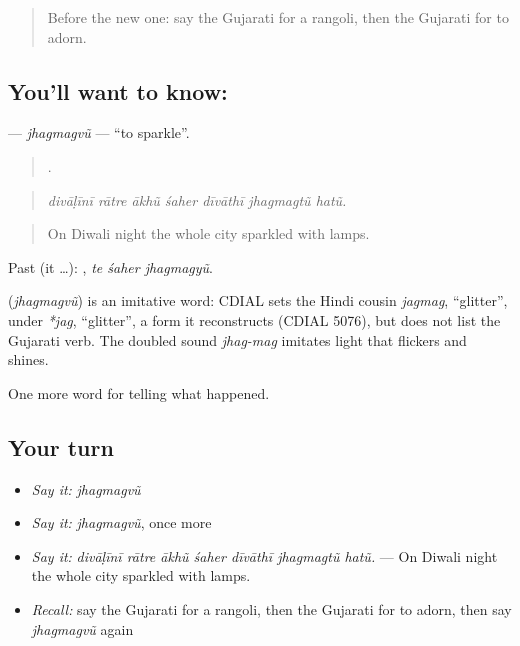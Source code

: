 \label{lesson:GU-C329-jhagmagvu}



\begin{quote}
Before the new one: say the Gujarati for a rangoli, then the Gujarati for to adorn.
\end{quote}

\subsection*{You'll want to know: }
\textbf{} — \emph{jhagmagvũ} — \textquotedblleft{}to sparkle\textquotedblright{}.

\begin{quote}
      .
\end{quote}

\begin{quote}
\emph{divāḷīnī rātre ākhũ śaher dīvāthī jhagmagtũ hatũ.}
\end{quote}

\begin{quote}
On Diwali night the whole city sparkled with lamps.
\end{quote}

Past (it …):   , \emph{te śaher jhagmagyũ}.

\begin{cousinweb}
\textbf{} (\emph{jhagmagvũ}) is an imitative word: CDIAL sets the Hindi cousin \emph{jagmag}, \textquotedblleft{}glitter\textquotedblright{}, under \emph{*jag}, \textquotedblleft{}glitter\textquotedblright{}, a form it reconstructs (CDIAL 5076), but does not list the Gujarati verb. The doubled sound \emph{jhag-mag} imitates light that flickers and shines.
\end{cousinweb}

\begin{grammarlens}[title={What you've built}]
One more word for telling what happened.
\end{grammarlens}

\subsection*{Your turn}
\begin{itemize}
\raggedright
  \item \emph{Say it:} \emph{jhagmagvũ}
  \item \emph{Say it:} \emph{jhagmagvũ}, once more
  \item \emph{Say it:} \emph{divāḷīnī rātre ākhũ śaher dīvāthī jhagmagtũ hatũ.} — On Diwali night the whole city sparkled with lamps.
  \item \emph{Recall:} say the Gujarati for a rangoli, then the Gujarati for to adorn, then say \emph{jhagmagvũ} again
\end{itemize}


